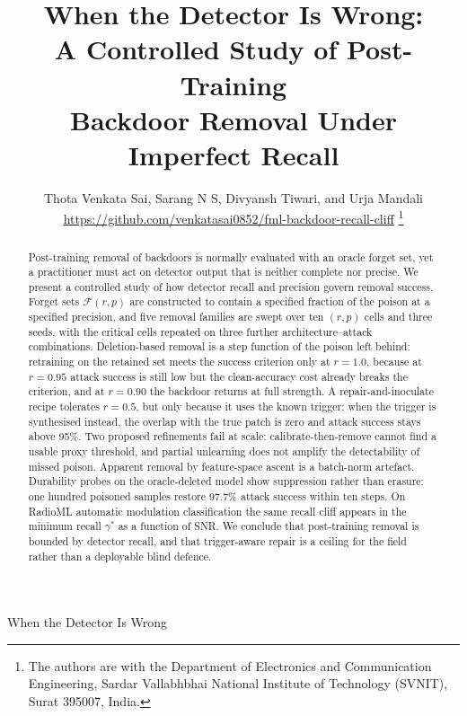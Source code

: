 \documentclass[journal]{IEEEtran}
\newcommand{\fset}{\mathcal{F}}
\newcommand{\gstar}{\gamma^{\ast}}
\begin{document}
\title{When the Detector Is Wrong:\\A Controlled Study of Post-Training\\Backdoor Removal Under Imperfect Recall}

\author{Thota Venkata Sai, Sarang N S, Divyansh Tiwari, and Urja Mandali%
\\[0.6ex]{\normalsize\protect\url{https://github.com/venkatasai0852/fml-backdoor-recall-cliff}}%
\thanks{The authors are with the Department of Electronics and Communication
Engineering, Sardar Vallabhbhai National Institute of Technology (SVNIT),
Surat 395007, India.}}

%
{When the Detector Is Wrong}

\maketitle

\begin{abstract}
Post-training removal of backdoors is normally evaluated with an oracle forget
set, yet a practitioner must act on detector output that is neither complete
nor precise. We present a controlled study of how detector recall and precision
govern removal success. Forget sets $\fset(r,p)$ are constructed to contain a
specified fraction of the poison at a specified precision, and five removal
families are swept over ten $(r,p)$ cells and three seeds, with the critical
cells repeated on three further architecture--attack combinations.
Deletion-based removal is a step function of the
poison left behind: retraining on the retained set meets the success criterion
only at $r{=}1.0$, because at $r{=}0.95$ attack success is still low but the
clean-accuracy cost already breaks the criterion, and at $r{=}0.90$ the
backdoor returns at full strength. A repair-and-inoculate recipe tolerates
$r{=}0.5$, but only
because it uses the known trigger; when the trigger is synthesised instead, the
overlap with the true patch is zero and attack success stays above 95\%. Two
proposed refinements fail at scale: calibrate-then-remove cannot find a usable
proxy threshold, and partial unlearning does not amplify the detectability of
missed poison. Apparent removal by feature-space ascent is a batch-norm
artefact. Durability probes on the oracle-deleted model show suppression rather
than erasure: one hundred poisoned samples restore 97.7\% attack success within
ten steps. On RadioML automatic modulation classification the same recall cliff
appears in the minimum recall $\gstar$ as a function of SNR. We conclude that
post-training removal is bounded by detector recall, and that trigger-aware
repair is a ceiling for the field rather than a deployable blind defence.
\end{abstract}
\end{document}
